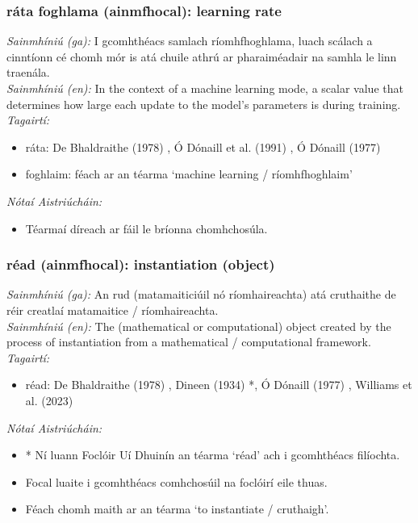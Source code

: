 \subsubsection*{ráta foghlama (ainmfhocal): learning rate}
 \noindent \textit{Sainmhíniú (ga):} I gcomhthéacs samlach ríomhfhoghlama, luach scálach a cinntíonn cé chomh mór is atá chuile athrú ar pharaiméadair na samhla le linn traenála.
\\
 \noindent \textit{Sainmhíniú (en):} In the context of a machine learning mode, a scalar value that determines how large each update to the model's parameters is during training.
\\
 \noindent \textit{Tagairtí:}
\begin{itemize}
	\item ráta: De Bhaldraithe (1978) \cite{de-bhaldraithe}, Ó Dónaill et al. (1991) \cite{focloir-beag}, Ó Dónaill (1977) \cite{odonaill}
	\item foghlaim: féach ar an téarma `machine learning / ríomhfhoghlaim'
\end{itemize}

 \noindent \textit{Nótaí Aistriúcháin:}
\begin{itemize}
	\item Téarmaí díreach ar fáil le bríonna chomhchosúla.
\end{itemize}


\subsubsection*{réad (ainmfhocal): instantiation (object)}
 \noindent \textit{Sainmhíniú (ga):} An rud (matamaiticiúil nó ríomhaireachta) atá cruthaithe de réir creatlaí matamaitice / ríomhaireachta.
\\
 \noindent \textit{Sainmhíniú (en):} The (mathematical or computational) object created by the process of instantiation from a mathematical / computational framework.
\\
 \noindent \textit{Tagairtí:}
\begin{itemize}
	\item réad: De Bhaldraithe (1978) \cite{de-bhaldraithe}, Dineen (1934) \cite{dineen}*, Ó Dónaill (1977) \cite{odonaill}, Williams et al. (2023) \cite{storchiste}
\end{itemize}

 \noindent \textit{Nótaí Aistriúcháin:}
\begin{itemize}
	\item * Ní luann Foclóir Uí Dhuinín an téarma `réad' ach i gcomhthéacs filíochta.
	\item Focal luaite i gcomhthéacs comhchosúil na foclóirí eile thuas.
	\item Féach chomh maith ar an téarma `to instantiate / cruthaigh'.
\end{itemize}


